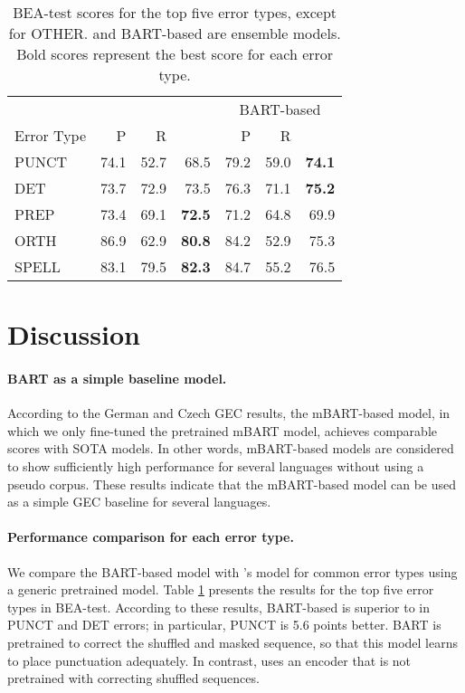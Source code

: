 \documentclass[11pt,a4paper]{article}
\begin{document}
\begin{table}[t]
    \centering
    \small
    \begin{tabular}{lrrrrrr} \toprule
          & \multicolumn{3}{c}{\citet{kaneko_bert}} &
          \multicolumn{3}{c}{BART-based} \\ \cmidrule(lr){2-4} \cmidrule(lr){5-7}
        Error Type   & P & R &  & P & R &  \\ \midrule
        PUNCT & 74.1 & 52.7 & 68.5 & 79.2 & 59.0 & \textbf{74.1} \\
        DET & 73.7 & 72.9 & 73.5 & 76.3 & 71.1 & \textbf{75.2} \\
        PREP & 73.4 & 69.1 & \textbf{72.5} & 71.2 & 64.8 & 69.9 \\
        ORTH & 86.9 & 62.9 & \textbf{80.8} & 84.2 & 52.9 & 75.3 \\
        SPELL & 83.1 & 79.5 & \textbf{82.3} & 84.7 & 55.2 & 76.5 \\ \bottomrule
    \end{tabular}
    \caption{BEA-test scores for the top five error types, except for OTHER. \citet{kaneko_bert} and BART-based are ensemble models. Bold scores represent the best score for each error type.}
    \label{analysis_bart}
\end{table}

\section{Discussion}
\paragraph{BART as a simple baseline model.}
According to the German and Czech GEC results, the mBART-based model, in which we only fine-tuned the pretrained mBART model, achieves comparable scores with SOTA models.
In other words, mBART-based models are considered to show sufficiently high performance for several languages without using a pseudo corpus.
These results indicate that the mBART-based model can be used as a simple GEC baseline for several languages.

\paragraph{Performance comparison for each error type.}
We compare the BART-based model with \citet{kaneko_bert}'s model for common error types using a generic pretrained model.
Table \ref{analysis_bart} presents the results for the top five error types in BEA-test.
According to these results, BART-based is superior to \citet{kaneko_bert} in PUNCT and DET errors;
 in particular, PUNCT is 5.6  points better.
BART is pretrained to correct the shuffled and masked sequence,
 so that this model learns to place punctuation adequately.
In contrast, \citet{kaneko_bert} uses an encoder
 that is not pretrained with correcting shuffled sequences.
\end{document}
